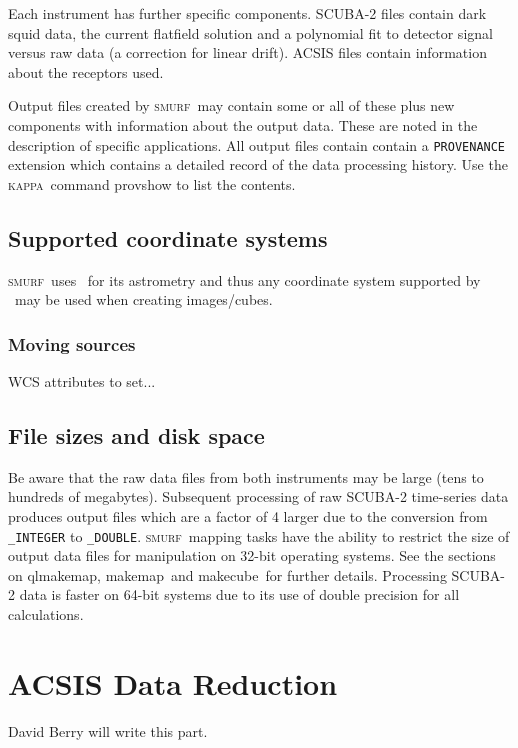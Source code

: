 \documentclass[twoside,11pt]{article}
\newcommand{\xref}[3]{#1}
\newcommand{\xlabel}[1]{}
\renewcommand{\_}{\texttt{\symbol{95}}}
\newcommand{\KAPPA}{\textsc{kappa}}
\newcommand{\SMURF}{\textsc{smurf}}
\newcommand{\task}[1]{\textsf{#1}}
\newcommand{\makecube}{\xref{\task{makecube}}{sun258}{MAKECUBE}}
\newcommand{\qlmakemap}{\xref{\task{qlmakemap}}{sun258}{QLMAKEMAP}}
\newcommand{\makemap}{\xref{\task{makemap}}{sun258}{MAKEMAP}}
\begin{document}
Each instrument has further specific components. SCUBA-2 files contain
dark squid data, the current flatfield solution and a polynomial fit
to detector signal versus raw data (a correction for linear drift).
ACSIS files contain information about the receptors used.

Output files created by \SMURF\ may contain some or all of these plus
new components with information about the output data. These are noted
in the description of specific applications. All output files contain
contain a \texttt{PROVENANCE} extension which contains a detailed
record of the data processing history. Use the \KAPPA\ command
provshow to list the contents.

\subsection{Supported coordinate systems}

\SMURF\ uses \AST\ for its astrometry and thus any coordinate system
supported by \AST\ may be used when creating images/cubes.

\subsubsection{Moving sources}

WCS attributes to set...

\subsection{File sizes and disk space}

Be aware that the raw data files from both instruments may be large
(tens to hundreds of megabytes). Subsequent processing of raw SCUBA-2
time-series data produces output files which are a factor of 4 larger
due to the conversion from \verb+_INTEGER+ to \verb+_DOUBLE+. \SMURF\
mapping tasks have the ability to restrict the size of output data
files for manipulation on 32-bit operating systems. See the sections
on \qlmakemap, \makemap\ and \makecube\ for further
details. Processing SCUBA-2 data is faster on 64-bit systems due to
its use of double precision for all calculations.

\section{\xlabel{acsis}ACSIS Data Reduction\label{se:acsisdr}}

David Berry will write this part.
\end{document}
